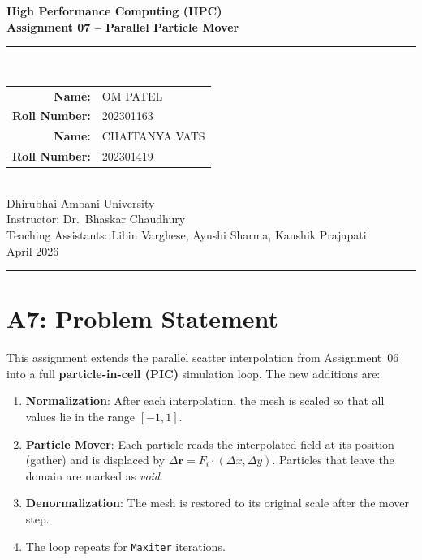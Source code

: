\documentclass[12pt,a4paper]{article}
\begin{document}
\begin{center}
{\LARGE\bfseries High Performance Computing (HPC)\\[0.3cm]}
{\Large\bfseries Assignment 07 -- Parallel Particle Mover\\[0.8cm]}
\rule{\textwidth}{1pt}\\[0.6cm]
{\large
\begin{tabular}{rl}
\textbf{Name:}        & OM PATEL \\
\textbf{Roll Number:} & 202301163 \\[0.4cm]
\textbf{Name:}        & CHAITANYA VATS \\
\textbf{Roll Number:} & 202301419 \\
\end{tabular}
}\\[0.8cm]
{\large Dhirubhai Ambani University \\[0.2cm]}
{\large Instructor: Dr.\ Bhaskar Chaudhury \\[0.2cm]}
{\large Teaching Assistants: Libin Varghese, Ayushi Sharma, Kaushik Prajapati \\[0.4cm]}
{\large April 2026}\\[0.3cm]
\rule{\textwidth}{1pt}
\end{center}


\section{A7: Problem Statement}

This assignment extends the parallel scatter interpolation from Assignment~06 into a full
\textbf{particle-in-cell (PIC)} simulation loop. The new additions are:

\begin{enumerate}
    \item \textbf{Normalization}: After each interpolation, the mesh is scaled so that all
          values lie in the range $[-1, 1]$.
    \item \textbf{Particle Mover}: Each particle reads the interpolated field at its
          position (gather) and is displaced by $\Delta\mathbf{r} = F_{i} \cdot (\Delta x,
          \Delta y)$. Particles that leave the domain are marked as \textit{void}.
    \item \textbf{Denormalization}: The mesh is restored to its original scale after the
          mover step.
    \item The loop repeats for \texttt{Maxiter} iterations.
\end{enumerate}
\end{document}
